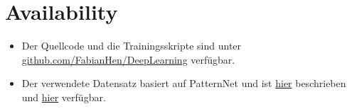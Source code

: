 \section*{Availability}
\begin{itemize}
    \item Der Quellcode und die Trainingsskripte sind unter
          \href{https://github.com/FabianHen/DeepLearning}{github.com/FabianHen/DeepLearning}
          verf\"ugbar.
    \item Der verwendete Datensatz basiert auf PatternNet und ist \href{https://doi.org/10.1016/j.isprsjprs.2018.01.004}{hier}
          beschrieben und \href{https://huggingface.co/datasets/blanchon/PatternNet}{hier} verfügbar.
\end{itemize}